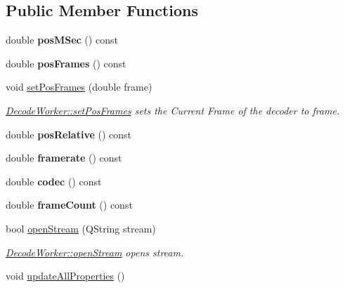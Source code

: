 \subsection*{Public Member Functions}
\begin{DoxyCompactItemize}
\item 
double {\bfseries pos\+M\+Sec} () const \hypertarget{classDecodeWorker_a59558b70a06566371f5b21b0c173cdd5}{}\label{classDecodeWorker_a59558b70a06566371f5b21b0c173cdd5}

\item 
double {\bfseries pos\+Frames} () const \hypertarget{classDecodeWorker_a2abfa502c10abf0af86a345ef459d2d2}{}\label{classDecodeWorker_a2abfa502c10abf0af86a345ef459d2d2}

\item 
void \hyperlink{classDecodeWorker_a485dae2b43c26af4832bccf8a2eaa3e4}{set\+Pos\+Frames} (double frame)
\begin{DoxyCompactList}\small\item\em \hyperlink{classDecodeWorker_a485dae2b43c26af4832bccf8a2eaa3e4}{Decode\+Worker\+::set\+Pos\+Frames} sets the Current Frame of the decoder to frame. \end{DoxyCompactList}\item 
double {\bfseries pos\+Relative} () const \hypertarget{classDecodeWorker_a1655a4700f7c4bbce116d51b43d00460}{}\label{classDecodeWorker_a1655a4700f7c4bbce116d51b43d00460}

\item 
double {\bfseries framerate} () const \hypertarget{classDecodeWorker_a08837d85e00320eb7f1b6ca665183c9e}{}\label{classDecodeWorker_a08837d85e00320eb7f1b6ca665183c9e}

\item 
double {\bfseries codec} () const \hypertarget{classDecodeWorker_aacd4b1b5e2e6535bcc89e4600666d357}{}\label{classDecodeWorker_aacd4b1b5e2e6535bcc89e4600666d357}

\item 
double {\bfseries frame\+Count} () const \hypertarget{classDecodeWorker_a859f0abdaf0e932e1b4349b496dce273}{}\label{classDecodeWorker_a859f0abdaf0e932e1b4349b496dce273}

\item 
bool \hyperlink{classDecodeWorker_a4bbc60cd77f71a0c52b06a56e4b84622}{open\+Stream} (Q\+String stream)
\begin{DoxyCompactList}\small\item\em \hyperlink{classDecodeWorker_a4bbc60cd77f71a0c52b06a56e4b84622}{Decode\+Worker\+::open\+Stream} opens stream. \end{DoxyCompactList}\item 
void \hyperlink{classDecodeWorker_a64fe44b112f634f847f0c68123680cd6}{update\+All\+Properties} ()\hypertarget{classDecodeWorker_a64fe44b112f634f847f0c68123680cd6}{}\label{classDecodeWorker_a64fe44b112f634f847f0c68123680cd6}


\end{DoxyCompactItemize}
